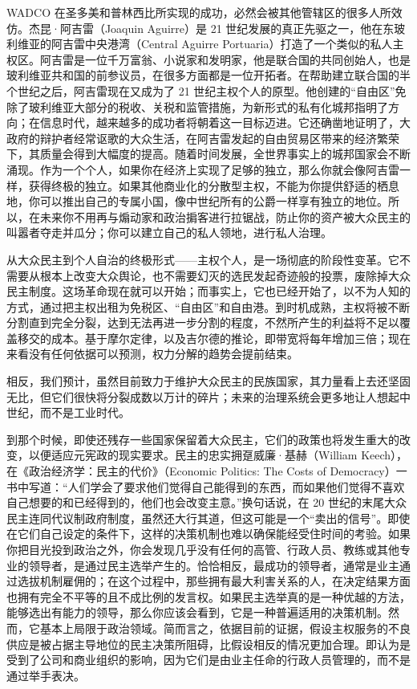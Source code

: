 WADCO 在圣多美和普林西比所实现的成功，必然会被其他管辖区的很多人所效仿。杰昆·阿吉雷（Joaquin Aguirre）是 21 世纪发展的真正先驱之一，他在东玻利维亚的阿吉雷中央港湾（Central Aguirre Portuaria）打造了一个类似的私人主权区。阿吉雷是一位千万富翁、小说家和发明家，他是联合国的共同创始人，也是玻利维亚共和国的前参议员，在很多方面都是一位开拓者。在帮助建立联合国的半个世纪之后，阿吉雷现在又成为了 21 世纪主权个人的原型。他创建的“自由区”免除了玻利维亚大部分的税收、关税和监管措施，为新形式的私有化城邦指明了方向；在信息时代，越来越多的成功者将朝着这一目标迈进。它还确凿地证明了，大政府的辩护者经常讴歌的大众生活，在阿吉雷发起的自由贸易区带来的经济繁荣下，其质量会得到大幅度的提高。随着时间发展，全世界事实上的城邦国家会不断涌现。作为一个个人，如果你在经济上实现了足够的独立，那么你就会像阿吉雷一样，获得终极的独立。如果其他商业化的分散型主权，不能为你提供舒适的栖息地，你可以推出自己的专属小国，像中世纪所有的公爵一样享有独立的地位。所以，在未来你不用再与煽动家和政治掮客进行拉锯战，防止你的资产被大众民主的叫嚣者夺走并瓜分；你可以建立自己的私人领地，进行私人治理。

从大众民主到个人自治的终极形式——主权个人，是一场彻底的阶段性变革。它不需要从根本上改变大众舆论，也不需要幻灭的选民发起奇迹般的投票，废除掉大众民主制度。这场革命现在就可以开始；而事实上，它也已经开始了，以不为人知的方式，通过把主权出租为免税区、“自由区”和自由港。到时机成熟，主权将被不断分割直到完全分裂，达到无法再进一步分割的程度，不然所产生的利益将不足以覆盖移交的成本。基于摩尔定律，以及吉尔德的推论，即带宽将每年增加三倍；现在来看没有任何依据可以预测，权力分解的趋势会提前结束。

相反，我们预计，虽然目前致力于维护大众民主的民族国家，其力量看上去还坚固无比，但它们很快将分裂成数以万计的碎片；未来的治理系统会更多地让人想起中世纪，而不是工业时代。

到那个时候，即使还残存一些国家保留着大众民主，它们的政策也将发生重大的改变，以便适应元宪政的现实要求。民主的忠实拥趸威廉·基赫（William Keech），在《政治经济学：民主的代价》（Economic Politics: The Costs of Democracy）一书中写道：“人们学会了要求他们觉得自己能得到的东西，而如果他们觉得不喜欢自己想要的和已经得到的，他们也会改变主意。”换句话说，在 20 世纪的末尾大众民主连同代议制政府制度，虽然还大行其道，但这可能是一个“卖出的信号”。即使在它们自己设定的条件下，这样的决策机制也难以确保能经受住时间的考验。如果你把目光投到政治之外，你会发现几乎没有任何的高管、行政人员、教练或其他专业的领导者，是通过民主选举产生的。恰恰相反，最成功的领导者，通常是业主通过选拔机制雇佣的；在这个过程中，那些拥有最大利害关系的人，在决定结果方面也拥有完全不平等的且不成比例的发言权。如果民主选举真的是一种优越的方法，能够选出有能力的领导，那么你应该会看到，它是一种普遍适用的决策机制。然而，它基本上局限于政治领域。简而言之，依据目前的证据，假设主权服务的不良供应是被占据主导地位的民主决策所阻碍，比假设相反的情况更加合理。即认为是受到了公司和商业组织的影响，因为它们是由业主任命的行政人员管理的，而不是通过举手表决。

